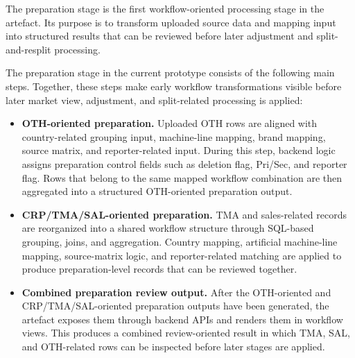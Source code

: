



The preparation stage is the first workflow-oriented processing stage in the artefact. Its purpose is to transform uploaded source data and mapping input into structured results that can be reviewed before later adjustment and split-and-resplit processing.

The preparation stage in the current prototype consists of the following main steps. Together, these steps make early workflow transformations visible before later market view, adjustment, and split-related processing is applied:

\begin{itemize}
    \item \textbf{OTH-oriented preparation.}  
    Uploaded OTH rows are aligned with country-related grouping input, machine-line mapping, brand mapping, source matrix, and reporter-related input. During this step, backend logic assigns preparation control fields such as deletion flag, Pri/Sec, and reporter flag. Rows that belong to the same mapped workflow combination are then aggregated into a structured OTH-oriented preparation output.

    \item \textbf{CRP/TMA/SAL-oriented preparation.}  
    TMA and sales-related records are reorganized into a shared workflow structure through SQL-based grouping, joins, and aggregation. Country mapping, artificial machine-line mapping, source-matrix logic, and reporter-related matching are applied to produce preparation-level records that can be reviewed together.

    \item \textbf{Combined preparation review output.}  
    After the OTH-oriented and CRP/TMA/SAL-oriented preparation outputs have been generated, the artefact exposes them through backend APIs and renders them in workflow views. This produces a combined review-oriented result in which TMA, SAL, and OTH-related rows can be inspected before later stages are applied.
\end{itemize}






